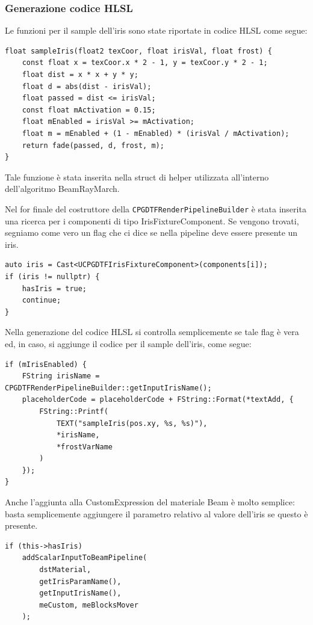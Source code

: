 \documentclass[main.tex]{subfiles}
\begin{document}
\subsubsection{Generazione codice HLSL}\label{subsec:5_2_IrisHlsl}
Le funzioni per il sample dell'iris sono state riportate in codice HLSL come segue:
\lstset{language=glsl}
\begin{lstlisting}
float sampleIris(float2 texCoor, float irisVal, float frost) {
    const float x = texCoor.x * 2 - 1, y = texCoor.y * 2 - 1;
    float dist = x * x + y * y;
    float d = abs(dist - irisVal);
    float passed = dist <= irisVal;
    const float mActivation = 0.15;
    float mEnabled = irisVal >= mActivation;
    float m = mEnabled + (1 - mEnabled) * (irisVal / mActivation);
    return fade(passed, d, frost, m);
}
\end{lstlisting}
Tale funzione è stata inserita nella struct di helper utilizzata all'interno dell'algoritmo BeamRayMarch. \newline

Nel for finale del costruttore della \lstinline{CPGDTFRenderPipelineBuilder} è stata inserita una ricerca per i componenti di tipo IrisFixtureComponent. Se vengono trovati, segniamo come vero un flag che ci dice se nella pipeline deve essere presente un iris.
\lstset{language=UEcpp}
\begin{lstlisting}
auto iris = Cast<UCPGDTFIrisFixtureComponent>(components[i]);
if (iris != nullptr) {
    hasIris = true;
    continue;
}
\end{lstlisting}

Nella generazione del codice HLSL si controlla semplicemente se tale flag è vera ed, in caso, si aggiunge il codice per il sample dell'iris, come segue:
\begin{lstlisting}
if (mIrisEnabled) {
    FString irisName = CPGDTFRenderPipelineBuilder::getInputIrisName();
    placeholderCode = placeholderCode + FString::Format(*textAdd, {
        FString::Printf(
            TEXT("sampleIris(pos.xy, %s, %s)"),
            *irisName,
            *frostVarName
        )
    });
}
\end{lstlisting}

Anche l'aggiunta alla CustomExpression del materiale Beam è molto semplice: basta semplicemente aggiungere il parametro relativo al valore dell'iris se questo è presente.
\begin{lstlisting}
if (this->hasIris)
    addScalarInputToBeamPipeline(
        dstMaterial,
        getIrisParamName(),
        getInputIrisName(),
        meCustom, meBlocksMover
    );
\end{lstlisting}
\end{document}
